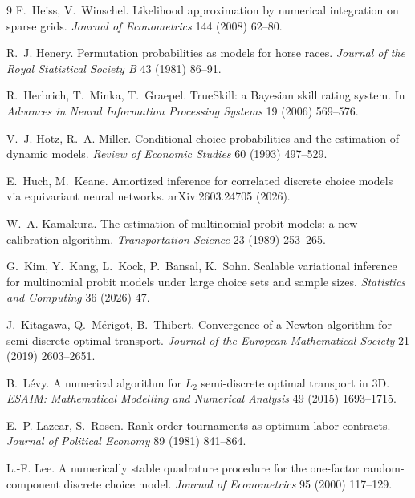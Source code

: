 \documentclass[12pt]{article}
\theoremstyle{remark}
\begin{document}
\begin{thebibliography}{9}
 F.~Heiss, V.~Winschel.
Likelihood approximation by numerical integration on sparse grids.
\emph{Journal of Econometrics} 144 (2008) 62--80.

 R.~J. Henery. Permutation
probabilities as models for horse races. \emph{Journal of the Royal
Statistical Society B} 43 (1981) 86--91.

 R.~Herbrich, T.~Minka, T.~Graepel. TrueSkill: a
Bayesian skill rating system. In \emph{Advances in Neural Information
Processing Systems} 19 (2006) 569--576.

 V.~J. Hotz, R.~A. Miller. Conditional choice
probabilities and the estimation of dynamic models. \emph{Review of
Economic Studies} 60 (1993) 497--529.

 E.~Huch, M.~Keane. Amortized inference for correlated
discrete choice models via equivariant neural networks. arXiv:2603.24705
(2026).

 W.~A. Kamakura. The estimation
of multinomial probit models: a new calibration algorithm.
\emph{Transportation Science} 23 (1989) 253--265.

G.~Kim, Y.~Kang, L.~Kock, P.~Bansal, K.~Sohn. Scalable variational
inference for multinomial probit models under large choice sets and
sample sizes. \emph{Statistics and Computing} 36 (2026) 47.

 J.~Kitagawa, Q.~M\'erigot, B.~Thibert. Convergence of
a Newton algorithm for semi-discrete optimal transport. \emph{Journal
of the European Mathematical Society} 21 (2019) 2603--2651.

 B.~L\'evy. A numerical algorithm for
$L_2$ semi-discrete optimal transport in 3D. \emph{ESAIM: Mathematical
Modelling and Numerical Analysis} 49 (2015) 1693--1715.

 E.~P. Lazear, S.~Rosen.
Rank-order tournaments as optimum labor contracts. \emph{Journal of
Political Economy} 89 (1981) 841--864.

 L.-F. Lee. A numerically stable quadrature
procedure for the one-factor random-component discrete choice model.
\emph{Journal of Econometrics} 95 (2000) 117--129.


\end{thebibliography}
\end{document}
